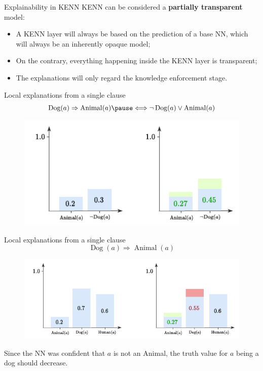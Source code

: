 \documentclass{beamer}
\begin{document}
\begin{frame}{Explainability in KENN}
KENN can be considered a \textbf{partially transparent} model:
\begin{itemize}
	\item A KENN layer will always be based on the prediction of a base NN, which will always be an inherently opaque model;
	\item On the contrary, everything happening inside the KENN layer is transparent;
	\item The explanations will only regard the knowledge enforcement stage.
\end{itemize}
\end{frame}


\begin{frame}{Local explanations from a single clause}
	$$\operatorname{Dog}(a) \Rightarrow \operatorname{Animal}(a) \pause \Longleftrightarrow \neg \operatorname{Dog}(a) \vee \operatorname{Animal}(a) $$ \pause
	\begin{figure}
		\includegraphics[width=0.9\linewidth]{images/explainability_example1.pdf}
	\end{figure}
\end{frame}

\begin{frame}{Local explanations from a single clause}
	$$\operatorname{Dog}(a) \Rightarrow \operatorname{Animal}(a)$$
	\begin{figure}
		\includegraphics[width=0.9\linewidth]{images/explainability_example2.pdf}
	\end{figure}
\pause
Since the NN was confident that $a$ is not an Animal, the truth value for $a$ being a dog should decrease.
\end{frame}
\end{document}
